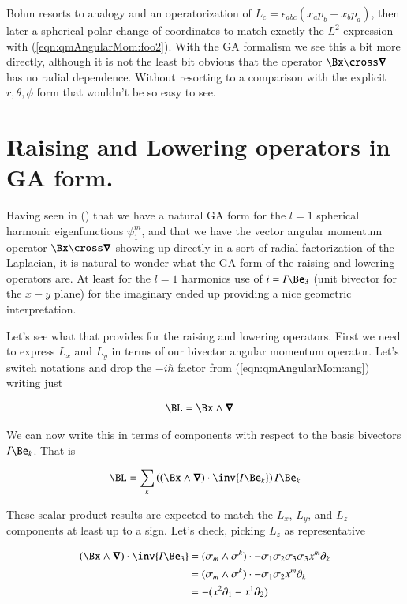 Bohm resorts to analogy and an operatorization of $L_c = \epsilon_{abc} (x_a p_b - x_b p_a)$, then later a spherical polar change of coordinates to match exactly the $L^2$ expression with (\ref{eqn:qmAngularMom:foo2}).  With the GA formalism we see this a bit more directly, although it is not the least bit obvious that the operator $\Bx \cross \spacegrad$ has no radial dependence.  Without resorting to a comparison with the explicit $r,\theta,\phi$ form that wouldn't be so easy to see.

\section{Raising and Lowering operators in GA form.}

Having seen in () that we have a natural GA form for the $l=1$ spherical harmonic eigenfunctions $\psi_1^{m}$, and that we have the vector angular momentum operator $\Bx \cross \spacegrad$ showing up directly in a sort-of-radial factorization of the Laplacian, it is natural to wonder what the GA form of the raising and lowering operators are.  At least for the $l=1$ harmonics use of $i = I \Be_3$ (unit bivector for the $x-y$ plane) for the imaginary ended up providing a nice geometric interpretation.

Let's see what that provides for the raising and lowering operators.  First we need to express $L_x$ and $L_y$ in terms of our bivector angular momentum operator.  Let's switch notations and drop the $-i \hbar$ factor from (\ref{eqn:qmAngularMom:ang}) writing just

\begin{align}\label{eqn:qmAngularMom:Ang}
\BL &= \Bx \wedge \spacegrad
\end{align}

We can now write this in terms of components with respect to the basis bivectors $I \Be_k$.  That is

\begin{align}\label{eqn:qmAngularMom:foo4}
\BL = \sum_k \left( (\Bx \wedge \spacegrad) \cdot \inv{I \Be_k}\right) I \Be_k
\end{align}

These scalar product results are expected to match the $L_x$, $L_y$, and $L_z$ components at least up to a sign.  Let's check, picking $L_z$ as representative

\begin{align*}
(\Bx \wedge \spacegrad) \cdot \inv{I \Be_3}
&=
(\sigma_m \wedge \sigma^k) \cdot {-\sigma_1 \sigma_2 \sigma_3 \sigma_3} x^m \partial_k \\
&=
(\sigma_m \wedge \sigma^k) \cdot {-\sigma_1 \sigma_2} x^m \partial_k \\
&=
-( x^2 \partial_1 - x^1 \partial_2 )
\end{align*}

